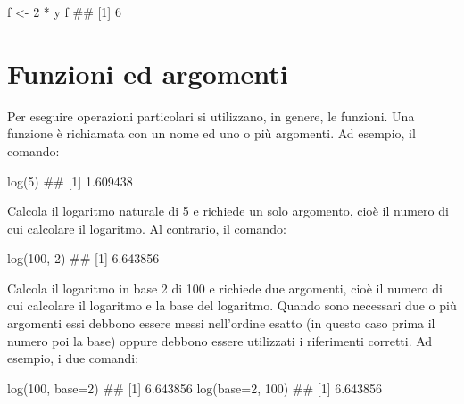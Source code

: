 \documentclass[a4paper,12pt,oneside]{book}
\newenvironment{Shaded}{}{}
\newcommand{\KeywordTok}[1]{#1}
\newcommand{\DataTypeTok}[1]{#1}
\newcommand{\DecValTok}[1]{#1}
\newcommand{\StringTok}[1]{#1}
\newcommand{\CommentTok}[1]{#1}
\newcommand{\OperatorTok}[1]{#1}
\newcommand{\NormalTok}[1]{#1}
\begin{document}
\begin{Shaded}
\begin{Highlighting}[]
\NormalTok{f  <-}\StringTok{  }\DecValTok{2} \OperatorTok{*}\StringTok{ }\NormalTok{y}
\NormalTok{f}
\CommentTok{## [1] 6}
\end{Highlighting}
\end{Shaded}

\hypertarget{funzioni-ed-argomenti}{%
\section*{Funzioni ed argomenti}\label{funzioni-ed-argomenti}}

Per eseguire operazioni particolari si utilizzano, in genere, le funzioni. Una funzione è richiamata con un nome ed uno o più argomenti. Ad esempio, il comando:

\begin{Shaded}
\begin{Highlighting}[]
\KeywordTok{log}\NormalTok{(}\DecValTok{5}\NormalTok{)}
\CommentTok{## [1] 1.609438}
\end{Highlighting}
\end{Shaded}

Calcola il logaritmo naturale di 5 e richiede un solo argomento, cioè il numero di cui calcolare il logaritmo. Al contrario, il comando:

\begin{Shaded}
\begin{Highlighting}[]
\KeywordTok{log}\NormalTok{(}\DecValTok{100}\NormalTok{, }\DecValTok{2}\NormalTok{)}
\CommentTok{## [1] 6.643856}
\end{Highlighting}
\end{Shaded}

Calcola il logaritmo in base 2 di 100 e richiede due argomenti, cioè il numero di cui calcolare il logaritmo e la base del logaritmo. Quando sono necessari due o più argomenti essi debbono essere messi nell'ordine esatto (in questo caso prima il numero poi la base) oppure debbono essere utilizzati i riferimenti corretti. Ad esempio, i due comandi:

\begin{Shaded}
\begin{Highlighting}[]
\KeywordTok{log}\NormalTok{(}\DecValTok{100}\NormalTok{, }\DataTypeTok{base=}\DecValTok{2}\NormalTok{)}
\CommentTok{## [1] 6.643856}
\KeywordTok{log}\NormalTok{(}\DataTypeTok{base=}\DecValTok{2}\NormalTok{, }\DecValTok{100}\NormalTok{)}
\CommentTok{## [1] 6.643856}
\end{Highlighting}
\end{Shaded}
\end{document}
